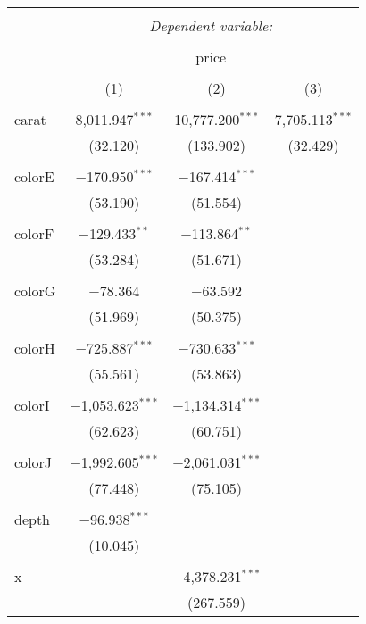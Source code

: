 
\begin{tabular}{@{\extracolsep{5pt}}lccc} 
\\[-1.8ex]\hline 
\hline \\[-1.8ex] 
 & \multicolumn{3}{c}{\textit{Dependent variable:}} \\ 
\cline{2-4} 
\\[-1.8ex] & \multicolumn{3}{c}{price} \\ 
\\[-1.8ex] & (1) & (2) & (3)\\ 
\hline \\[-1.8ex] 
 carat & 8,011.947$^{***}$ & 10,777.200$^{***}$ & 7,705.113$^{***}$ \\ 
  & (32.120) & (133.902) & (32.429) \\ 
  & & & \\ 
 colorE & $-$170.950$^{***}$ & $-$167.414$^{***}$ &  \\ 
  & (53.190) & (51.554) &  \\ 
  & & & \\ 
 colorF & $-$129.433$^{**}$ & $-$113.864$^{**}$ &  \\ 
  & (53.284) & (51.671) &  \\ 
  & & & \\ 
 colorG & $-$78.364 & $-$63.592 &  \\ 
  & (51.969) & (50.375) &  \\ 
  & & & \\ 
 colorH & $-$725.887$^{***}$ & $-$730.633$^{***}$ &  \\ 
  & (55.561) & (53.863) &  \\ 
  & & & \\ 
 colorI & $-$1,053.623$^{***}$ & $-$1,134.314$^{***}$ &  \\ 
  & (62.623) & (60.751) &  \\ 
  & & & \\ 
 colorJ & $-$1,992.605$^{***}$ & $-$2,061.031$^{***}$ &  \\ 
  & (77.448) & (75.105) &  \\ 
  & & & \\ 
 depth & $-$96.938$^{***}$ &  &  \\ 
  & (10.045) &  &  \\ 
  & & & \\ 
 x &  & $-$4,378.231$^{***}$ &  \\ 
  &  & (267.559) &  \\ 

\end{tabular}
